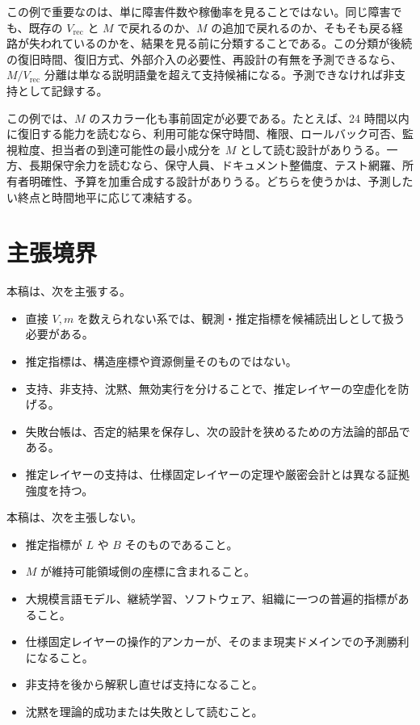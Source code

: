 \documentclass[12pt,a4paper]{article}
\begin{document}
この例で重要なのは、単に障害件数や稼働率を見ることではない。同じ障害でも、既存の \(V_{\mathrm{rec}}\) と \(M\) で戻れるのか、\(M\) の追加で戻れるのか、そもそも戻る経路が失われているのかを、結果を見る前に分類することである。この分類が後続の復旧時間、復旧方式、外部介入の必要性、再設計の有無を予測できるなら、\(M/V_{\mathrm{rec}}\) 分離は単なる説明語彙を超えて支持候補になる。予測できなければ非支持として記録する。

この例では、\(M\) のスカラー化も事前固定が必要である。たとえば、24 時間以内に復旧する能力を読むなら、利用可能な保守時間、権限、ロールバック可否、監視粒度、担当者の到達可能性の最小成分を \(M\) として読む設計がありうる。一方、長期保守余力を読むなら、保守人員、ドキュメント整備度、テスト網羅、所有者明確性、予算を加重合成する設計がありうる。どちらを使うかは、予測したい終点と時間地平に応じて凍結する。

\section{主張境界}\label{ux4e3bux5f35ux5883ux754c}

本稿は、次を主張する。

\begin{itemize}
\tightlist
\item
  直接 \(V,m\) を数えられない系では、観測・推定指標を候補読出しとして扱う必要がある。
\item
  推定指標は、構造座標や資源側量そのものではない。
\item
  支持、非支持、沈黙、無効実行を分けることで、推定レイヤーの空虚化を防げる。
\item
  失敗台帳は、否定的結果を保存し、次の設計を狭めるための方法論的部品である。
\item
  推定レイヤーの支持は、仕様固定レイヤーの定理や厳密会計とは異なる証拠強度を持つ。
\end{itemize}

本稿は、次を主張しない。

\begin{itemize}
\tightlist
\item
  推定指標が \(L\) や \(B\) そのものであること。
\item
  \(M\) が維持可能領域側の座標に含まれること。
\item
  大規模言語モデル、継続学習、ソフトウェア、組織に一つの普遍的指標があること。
\item
  仕様固定レイヤーの操作的アンカーが、そのまま現実ドメインでの予測勝利になること。
\item
  非支持を後から解釈し直せば支持になること。
\item
  沈黙を理論的成功または失敗として読むこと。
\end{itemize}
\end{document}
